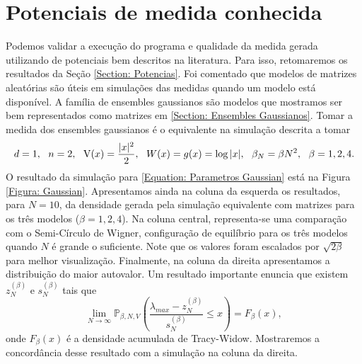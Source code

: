 \section{Potenciais de medida conhecida}

Podemos validar a execução do programa e qualidade da medida gerada utilizando de potenciais bem descritos na literatura. Para isso, retomaremos os resultados da Seção \ref{Section: Potencias}. Foi comentado que modelos de matrizes aleatórias são úteis em simulações das medidas quando um modelo está disponível. A família de ensembles gaussianos são modelos que mostramos ser bem representados como matrizes em \ref{Section: Ensembles Gaussianos}. Tomar a medida dos ensembles gaussianos é o equivalente na simulação descrita a tomar 
\begin{equation}
d = 1, \ \  n = 2, \ \ \operatorname{V}(x)=\frac{|x|^2}{2}, \ \ W(x) = g(x) = \log{|x|}, \ \ \beta_N = \beta N^2, \ \ \beta = 1,2,4.
\label{Equation: Parametros Gaussian}
\end{equation}
O resultado da simulação para \ref{Equation: Parametros Gaussian} está na Figura \ref{Figura: Gaussian}. Apresentamos ainda na coluna da esquerda os resultados, para $N=10$, da densidade gerada pela simulação equivalente com matrizes para os três modelos ($\beta = 1,2,4$). Na coluna central, representa-se uma comparação com o Semi-Círculo de Wigner, configuração de equilíbrio para os três modelos quando $N$ é grande o suficiente. Note que os valores foram escalados por $\sqrt{2 \beta}$ para melhor visualização. Finalmente, na coluna da direita apresentamos a distribuição do maior autovalor. Um resultado importante  \cite{Tracy} enuncia que existem $z_{N}^{(\beta)}$ e $s_N^{(\beta)}$ tais que $$\lim_{N \to \infty} \mathbb{P}_{\beta,N,V} \left( \frac{\lambda_{max} - z_{N}^{(\beta)}}{s_N^{(\beta)}} \leq x \right) = F_{\beta}(x),$$ onde $F_{\beta}(x)$ é a densidade acumulada de Tracy-Widow. Mostraremos a concordância desse resultado com a simulação na coluna da direita.
